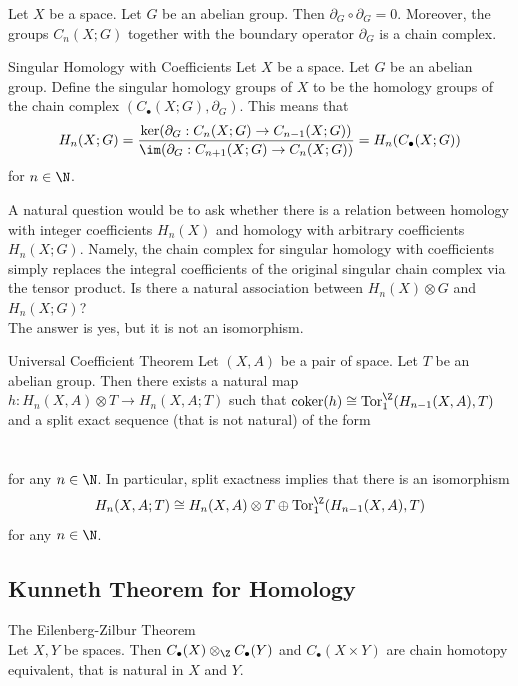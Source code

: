 \documentclass[a4paper]{article}
\begin{document}
\begin{lmm}{}{} Let $X$ be a space. Let $G$ be an abelian group. Then $\partial_G\circ\partial_G=0$. Moreover, the groups $C_n(X;G)$ together with the boundary operator $\partial_G$ is a chain complex. 
\end{lmm}

\begin{defn}{Singular Homology with Coefficients}{} Let $X$ be a space. Let $G$ be an abelian group. Define the singular homology groups of $X$ to be the homology groups of the chain complex $(C_\bullet(X;G),\partial_G)$. This means that $$H_n(X;G)=\frac{\ker(\partial_G:C_n(X;G)\to C_{n-1}(X;G))}{\im(\partial_G:C_{n+1}(X;G)\to C_n(X;G))}=H_n(C_\bullet(X;G))$$ for $n\in\N$. 
\end{defn}

A natural question would be to ask whether there is a relation between homology with integer coefficients $H_n(X)$ and homology with arbitrary coefficients $H_n(X;G)$. Namely, the chain complex for singular homology with coefficients simply replaces the integral coefficients of the original singular chain complex via the tensor product. Is there a natural association between $H_n(X)\otimes G$ and $H_n(X;G)$? \\

The answer is yes, but it is not an isomorphism. 

\begin{thm}{Universal Coefficient Theorem}{} Let $(X,A)$ be a pair of space. Let $T$ be an abelian group. Then there exists a natural map $h:H_n(X,A)\otimes T\to H_n(X,A;T)$ such that $\text{coker}(h)\cong\text{Tor}_1^\Z(H_{n-1}(X,A),T)$ and a split exact sequence (that is not natural) of the form \\~\\
\\
for any $n\in\N$. In particular, split exactness implies that there is an isomorphism $$H_n(X,A;T)\cong H_n(X,A)\otimes T\oplus\text{Tor}_1^\Z(H_{n-1}(X,A),T)$$ for any $n\in\N$. 
\end{thm}

\subsection{Kunneth Theorem for Homology}
\begin{thm}{The Eilenberg-Zilbur Theorem}{}\\
Let $X,Y$ be spaces. Then $C_\bullet(X)\otimes_\Z C_\bullet(Y)$ and $C_\bullet(X\times Y)$ are chain homotopy equivalent, that is natural in $X$ and $Y$. 
\end{thm}
\end{document}

